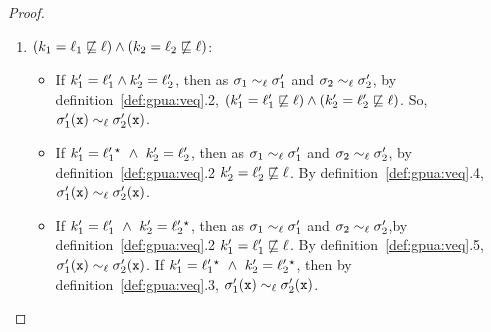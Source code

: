 \begin{proof}
\begin{enumerate}
\begin{itemize}
\begin{enumerate}
\item $(k_1 = \ell_1 \not\sqsubseteq \ell)\wedge (k_2 = \ell_2
  \not\sqsubseteq \ell)$:
 \begin{itemize}
\item  If $k_1' = \ell_1' \wedge k_2' = \ell_2'$, then as $\sigma_1
  \sim_\ell \sigma_1'$ and $\sigma_2 \sim_\ell \sigma_2'$, by
  definition~\ref{def:gpua:veq}.2, $(k_1' = \ell_1' \not\sqsubseteq
  \ell)\wedge (k_2' = \ell_2' \not\sqsubseteq \ell)$. So,
  $\sigma_1'(\texttt{x})  \sim_\ell \sigma_2'(\texttt{x})$.
 \item If $k_1' =  \ell_1'{}^\star   ~\wedge~k_2' = \ell_2'$, then as $\sigma_1
  \sim_\ell \sigma_1'$ and $\sigma_2 \sim_\ell \sigma_2'$, by
  definition~\ref{def:gpua:veq}.2  $k_2' = \ell_2' \not\sqsubseteq \ell$.
  By definition~\ref{def:gpua:veq}.4, $\sigma_1'(\texttt{x})
  \sim_\ell \sigma_2'(\texttt{x})$.
\item If $k_1' = \ell_1' ~\wedge~k_2' =  \ell_2'{}^\star  $, then as $\sigma_1
  \sim_\ell \sigma_1'$ and $\sigma_2 \sim_\ell \sigma_2'$,by
  definition~\ref{def:gpua:veq}.2 $k_1' = \ell_1' \not\sqsubseteq \ell$. 
  By definition~\ref{def:gpua:veq}.5, $\sigma_1'(\texttt{x})
  \sim_\ell \sigma_2'(\texttt{x})$.
If $k_1' =  \ell_1'{}^\star   ~\wedge~k_2' =
 \ell_2'{}^\star  $, then by definition~\ref{def:gpua:veq}.3,
$\sigma_1'(\texttt{x})   \sim_\ell \sigma_2'(\texttt{x})$.
 \end{itemize}


\end{enumerate}
\end{itemize}
\end{enumerate}
\end{proof}
